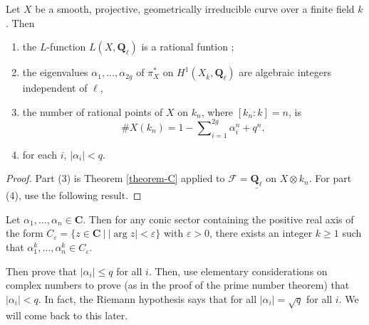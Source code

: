 \begin{lemma}
\label{lemma-count-points-projective}
Let $X$ be a smooth, projective, geometrically irreducible
curve over a finite field $k$. Then
\begin{enumerate}
\item the $L$-function $L(X, \mathbf{Q}_\ell)$ is a rational funtion ;
\item the eigenvalues $\alpha_1, \ldots, \alpha_{2g}$ of $\pi_X^*$ on
$H^1(X_{\bar k}, \mathbf{Q}_\ell)$ are algebraic integers
independent of $\ell$,
\item the number of rational points of $X$ on $k_n$, where $[k_n: k] = n$, is
$$
\# X(k_n) = 1 - \sum\nolimits_{i=1}^{2g}\alpha_i^n + q^n,
$$
\item for each $i$, $|\alpha_i| < q$.
\end{enumerate}
\end{lemma}

\begin{proof}
Part (3) is Theorem \ref{theorem-C} applied to $\mathcal{F} =
\underline{\mathbf{Q}_\ell}$ on $X \otimes k_n$. For part (4), use the
following result.
\end{proof}

\begin{exercise}
\label{exercise-powers}
Let $\alpha_1, \dots, \alpha_n \in \mathbf{C}$. Then for any conic sector
containing the positive real axis of the form $C_\varepsilon = \{ z \in
\mathbf{C} \ | \ |\arg z| < \varepsilon \}$ with $\varepsilon >0$, there exists
an integer $k \geq 1$ such that $\alpha_1^k, \dots, \alpha_n^k \in
C_\varepsilon$.
\end{exercise}

\noindent
Then prove that $|\alpha_i| \leq q$ for all $i$. Then, use elementary
considerations on complex numbers to prove (as in the proof of the prime number
theorem) that $|\alpha_i| < q$. In fact, the Riemann hypothesis says that for
all $|\alpha_i| = \sqrt q$ for all $i$. We will come back to this later.


